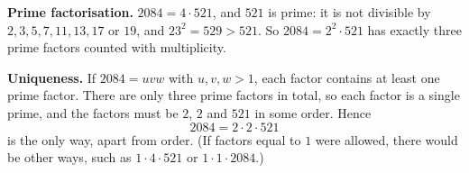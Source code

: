 \textbf{Prime factorisation.} $2084=4\cdot521$, and $521$ is prime: it is not divisible by $2,3,5,7,11,13,17$ or $19$, and $23^2=529>521$. So $2084=2^2\cdot521$ has exactly three prime factors counted with multiplicity.

\textbf{Uniqueness.} If $2084=uvw$ with $u,v,w>1$, each factor contains at least one prime factor. There are only three prime factors in total, so each factor is a single prime, and the factors must be $2$, $2$ and $521$ in some order. Hence
\[
2084=\boxed{2\cdot2\cdot521}
\]
is the only way, apart from order. (If factors equal to $1$ were allowed, there would be other ways, such as $1\cdot4\cdot521$ or $1\cdot1\cdot2084$.)
